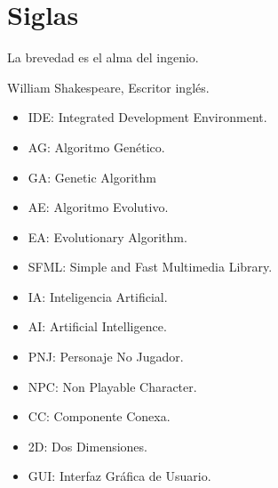 %
%
%
%
%

\chapter{Siglas}

\begin{FraseCelebre}
\begin{Frase}
La brevedad es el alma del ingenio.
\end{Frase}
\begin{Fuente}
William Shakespeare, Escritor ingl\'es.
\end{Fuente}
\end{FraseCelebre}


\begin{itemize}
	\item IDE: Integrated Development Environment.
	\item AG: Algoritmo Gen\'etico.
	\item GA: Genetic Algorithm
	\item AE: Algoritmo Evolutivo.
	\item EA: Evolutionary Algorithm.
	\item SFML: Simple and Fast Multimedia Library.
	\item IA: Inteligencia Artificial.
	\item AI: Artificial Intelligence.
	\item PNJ: Personaje No Jugador.
	\item NPC: Non Playable Character.
	\item CC: Componente Conexa.
	\item 2D: Dos Dimensiones.
	\item GUI: Interfaz Gr\'afica de Usuario.
\end{itemize}


